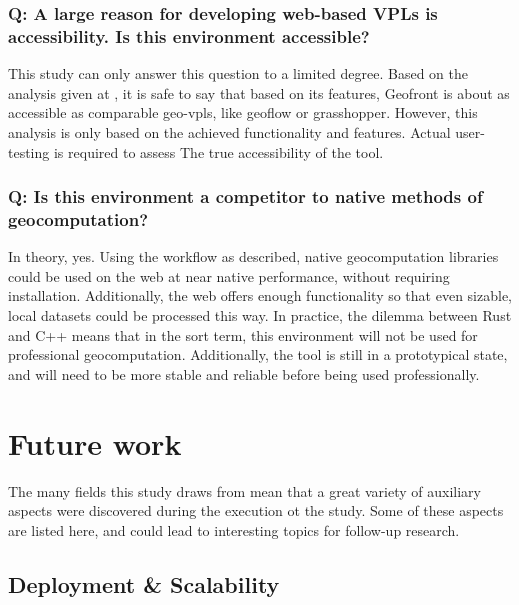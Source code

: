
\subsubsection*{Q: A large reason for developing web-based VPLs is accessibility.  Is this environment accessible?}

This study can only answer this question to a limited degree. 
Based on the analysis given at , it is safe to say that based on its features, Geofront is about as accessible as comparable geo-vpls, like geoflow or grasshopper. 
However, this analysis is only based on the achieved functionality and features. 
Actual user-testing is required to assess The true accessibility of the tool.

\subsubsection*{Q: Is this environment a competitor to native methods of geocomputation?}

In theory, yes.
Using the workflow as described, native geocomputation libraries could be used on the web at near native performance, without requiring installation.
Additionally, the web offers enough functionality so that even sizable, local datasets could be processed this way.
In practice, the dilemma between Rust and C++ means that in the sort term, this environment will not be used for professional geocomputation.
Additionally, the tool is still in a prototypical state, and will need to be more stable and reliable before being used professionally. 


\section{Future work}
\label{sec:future-work}
The many fields this study draws from mean that a great variety of auxiliary aspects were discovered during the execution ot the study. 
Some of these aspects are listed here, and could lead to interesting topics for follow-up research. 

\subsection{Deployment \& Scalability}

